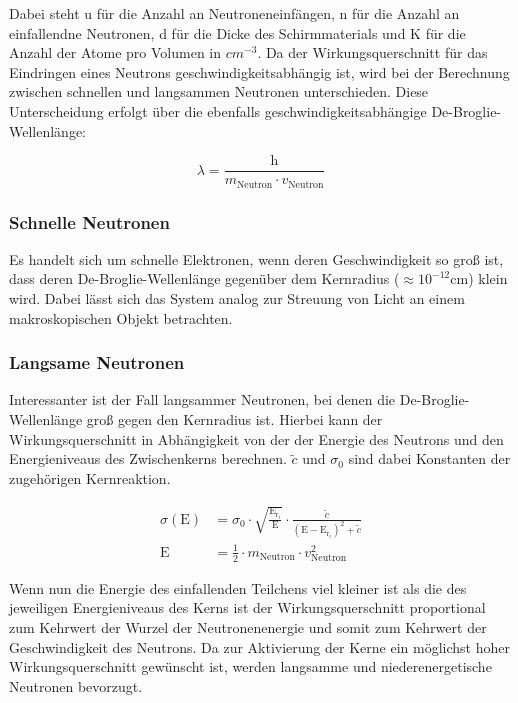         \noindent
        Dabei steht u für die Anzahl an Neutroneneinfängen, n für die Anzahl an einfallendne Neutronen, d für die Dicke des Schirmmaterials und K für die Anzahl der Atome pro Volumen in $cm^{-3}$.
        Da der Wirkungsquerschnitt für das Eindringen eines Neutrons geschwindigkeitsabhängig ist, wird bei der Berechnung zwischen schnellen und langsammen Neutronen unterschieden. Diese 
        Unterscheidung erfolgt über die ebenfalls geschwindigkeitsabhängige De-Broglie-Wellenlänge:

        \begin{equation*}
            \lambda = \frac{\text{h}}{m_{\text{Neutron}} \cdot v_{\text{Neutron}}}
        \end{equation*}

        \noindent

        \subsubsection*{Schnelle Neutronen}
            Es handelt sich um schnelle Elektronen, wenn deren Geschwindigkeit so groß ist, dass deren De-Broglie-Wellenlänge gegenüber dem Kernradius ($\approx 10^{-12}$cm) klein wird. Dabei 
            lässt sich das System analog zur Streuung von Licht an einem makroskopischen Objekt betrachten.

        \subsubsection*{Langsame Neutronen}
            Interessanter ist der Fall langsammer Neutronen, bei denen die De-Broglie-Wellenlänge groß gegen den Kernradius ist. Hierbei kann der Wirkungsquerschnitt in Abhängigkeit von der 
            der Energie des Neutrons und den Energieniveaus des Zwischenkerns berechnen. $\widetilde{c}$ und $\sigma_0$ sind dabei Konstanten der zugehörigen Kernreaktion.

            \begin{align*}
                \sigma(\text{E}) &= \sigma_0 \cdot \sqrt{\frac{\text{E}_{\text{r}_i}}{\text{E}}} \cdot \frac{\widetilde{c}}{\left(\text{E} - \text{E}_{\text{r}_i}\right)^2 + \widetilde{c}}\\
                \text{E} &= \frac{1}{2} \cdot m_{\text{Neutron}} \cdot v_{\text{Neutron}}^2
            \end{align*}

            \noindent
            Wenn nun die Energie des einfallenden Teilchens viel kleiner ist als die des jeweiligen Energieniveaus des Kerns ist der Wirkungsquerschnitt proportional zum Kehrwert der Wurzel der
            Neutronenenergie und somit zum Kehrwert der Geschwindigkeit des Neutrons. Da zur Aktivierung der Kerne ein möglichst hoher Wirkungsquerschnitt gewünscht ist, werden langsamme und
            niederenergetische Neutronen bevorzugt.

